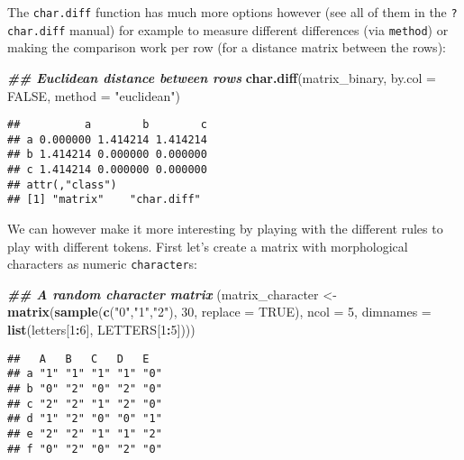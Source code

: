 \documentclass[
]{book}
\newenvironment{Shaded}{\begin{snugshade}}{\end{snugshade}}
\newcommand{\AttributeTok}[1]{\textcolor[rgb]{0.13,0.29,0.53}{#1}}
\newcommand{\ConstantTok}[1]{\textcolor[rgb]{0.56,0.35,0.01}{#1}}
\newcommand{\DecValTok}[1]{\textcolor[rgb]{0.00,0.00,0.81}{#1}}
\newcommand{\DocumentationTok}[1]{\textcolor[rgb]{0.56,0.35,0.01}{\textbf{\textit{#1}}}}
\newcommand{\FunctionTok}[1]{\textcolor[rgb]{0.13,0.29,0.53}{\textbf{#1}}}
\newcommand{\NormalTok}[1]{#1}
\newcommand{\OtherTok}[1]{\textcolor[rgb]{0.56,0.35,0.01}{#1}}
\newcommand{\SpecialCharTok}[1]{\textcolor[rgb]{0.81,0.36,0.00}{\textbf{#1}}}
\newcommand{\StringTok}[1]{\textcolor[rgb]{0.31,0.60,0.02}{#1}}
\begin{document}
The \texttt{char.diff} function has much more options however (see all of them in the \texttt{?char.diff} manual) for example to measure different differences (via \texttt{method}) or making the comparison work per row (for a distance matrix between the rows):

\begin{Shaded}
\begin{Highlighting}[]
\DocumentationTok{\#\# Euclidean distance between rows}
\FunctionTok{char.diff}\NormalTok{(matrix\_binary, }\AttributeTok{by.col =} \ConstantTok{FALSE}\NormalTok{, }\AttributeTok{method =} \StringTok{"euclidean"}\NormalTok{)}
\end{Highlighting}
\end{Shaded}

\begin{verbatim}
##          a        b        c
## a 0.000000 1.414214 1.414214
## b 1.414214 0.000000 0.000000
## c 1.414214 0.000000 0.000000
## attr(,"class")
## [1] "matrix"    "char.diff"
\end{verbatim}

We can however make it more interesting by playing with the different rules to play with different tokens.
First let's create a matrix with morphological characters as numeric \texttt{character}s:

\begin{Shaded}
\begin{Highlighting}[]
\DocumentationTok{\#\# A random character matrix}
\NormalTok{(matrix\_character }\OtherTok{\textless{}{-}} \FunctionTok{matrix}\NormalTok{(}\FunctionTok{sample}\NormalTok{(}\FunctionTok{c}\NormalTok{(}\StringTok{"0"}\NormalTok{,}\StringTok{"1"}\NormalTok{,}\StringTok{"2"}\NormalTok{), }\DecValTok{30}\NormalTok{, }\AttributeTok{replace =} \ConstantTok{TRUE}\NormalTok{), }\AttributeTok{ncol =} \DecValTok{5}\NormalTok{,}
                           \AttributeTok{dimnames =} \FunctionTok{list}\NormalTok{(letters[}\DecValTok{1}\SpecialCharTok{:}\DecValTok{6}\NormalTok{], LETTERS[}\DecValTok{1}\SpecialCharTok{:}\DecValTok{5}\NormalTok{])))}
\end{Highlighting}
\end{Shaded}

\begin{verbatim}
##   A   B   C   D   E  
## a "1" "1" "1" "1" "0"
## b "0" "2" "0" "2" "0"
## c "2" "2" "1" "2" "0"
## d "1" "2" "0" "0" "1"
## e "2" "2" "1" "1" "2"
## f "0" "2" "0" "2" "0"
\end{verbatim}
\end{document}
